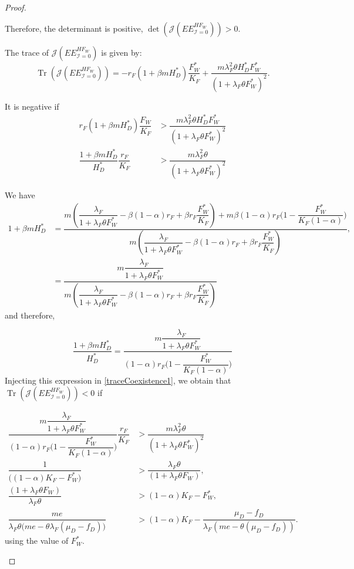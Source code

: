\documentclass{article}
\newcommand{\lfw}{\lambda_{F}}
\newcommand{\lfw}{\lambda_{F}}
\newcommand{\cI}{\mathcal{I}}
\DeclareMathOperator{\Tr}{Tr}
\begin{document}
\begin{proof}
\begin{itemize}
Therefore, the determinant is positive, $\det(\mathcal{J}(EE^{HF_W}_{\cI = 0})) > 0$.

The trace of $\mathcal{J}(EE^{HF_W}_{\cI = 0})$ is given by:
\begin{equation*}
\Tr(\mathcal{J}(EE^{HF_W}_{\cI = 0})) = - r_F(1+\beta m H_D^*) \dfrac{F_W^*}{K_F} +  \dfrac{ m \lfw^2 \theta H_D^* F_W^*}{(1 + \lfw \theta F_W^*)^2}.
\end{equation*}

It is negative if
\begin{subequations}
\begin{align}
r_F(1+\beta m H_D^*) \dfrac{F_W}{K_F} &>  \dfrac{ m \lfw^2 \theta H_D^* F_W^*}{(1 + \lfw \theta F_W^*)^2} \\
\dfrac{1+\beta m H_D^*}{H_D^*} \dfrac{r_F}{K_F} &>  \dfrac{ m \lfw^2 \theta }{(1 + \lfw \theta F_W^*)^2} \label{traceCoexistence1}
\end{align}
\end{subequations}

We have 
\begin{align*}
1+ \beta m H_D^* & = \dfrac{m\left(\dfrac{\lfw}{1 + \lfw \theta F_W^*} - \beta (1-\alpha) r_F + \beta r_F  \dfrac{F^*_{W}}{K_F}\right) + m \beta(1-\alpha)r_F\Big(1 - \dfrac{F^*_{W}}{K_F(1-\alpha)} \Big)}{m\left(\dfrac{\lfw}{1 + \lfw \theta F_W^*} - \beta (1-\alpha) r_F + \beta r_F  \dfrac{F^*_{W}}{K_F}\right)},  \\
&= \dfrac{m\dfrac{\lfw}{1 + \lfw \theta F_W^*}}{m\left(\dfrac{\lfw}{1 + \lfw \theta F_W^*} - \beta (1-\alpha) r_F + \beta r_F  \dfrac{F^*_{W}}{K_F}\right)}
\end{align*} 
and therefore, 

\begin{equation*}
\dfrac{1+ \beta m H_D^*}{H_D^*} = \dfrac{m\dfrac{\lfw}{1 + \lfw \theta F_W^*}}{(1-\alpha)r_F\Big(1 - \dfrac{F^*_{W}}{K_F(1-\alpha)} \Big)}
\end{equation*}
Injecting this expression in \eqref{traceCoexistence1}, we obtain that $\Tr(\mathcal{J}(EE^{HF_W}_{\cI = 0})) < 0$ if

\begin{subequations}
\begin{align*}
\dfrac{m\dfrac{\lfw}{1 + \lfw \theta F_W^*}}{(1-\alpha)r_F\Big(1 - \dfrac{F^*_{W}}{K_F(1-\alpha)} \Big)} \dfrac{r_F}{K_F} &>  \dfrac{ m \lfw^2 \theta }{(1 + \lfw \theta F_W^*)^2} \\
\dfrac{1}{\Big((1-\alpha) K_F - {F^*_{W}} \Big)}  &>  \dfrac{ \lfw \theta }{(1 + \lfw \theta F_W)}, \\
\dfrac{(1 + \lfw \theta F_W)}{ \lfw \theta } & > (1-\alpha) K_F - F^*_{W}, \\
\dfrac{me}{ \lfw \theta \Big(me - \theta \lfw (\mu_D - f_D) \Big)} & > (1-\alpha) K_F - \dfrac{\mu_D - f_D}{\lfw (me - \theta (\mu_D - f_D))}.
\end{align*}
\end{subequations}
using the value of $F_W^*$.


\end{itemize}
\end{proof}
\end{document}
